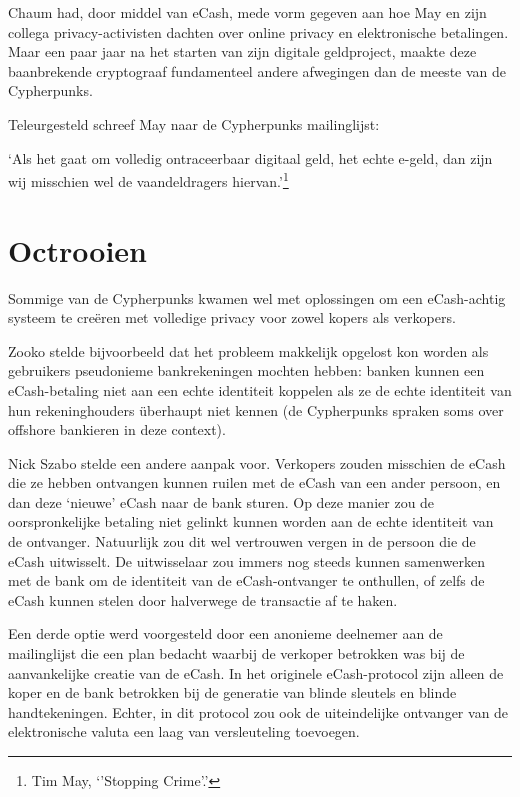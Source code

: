 \documentclass[
  a5paper,
  smalldemyvopaper,11pt,twoside,onecolumn,openright,extrafontsizes,
hidelinks]{memoir}
\begin{document}
Chaum had, door middel van eCash, mede vorm gegeven aan hoe May en zijn
collega privacy-activisten dachten over online privacy en elektronische
betalingen. Maar een paar jaar na het starten van zijn digitale
geldproject, maakte deze baanbrekende cryptograaf fundamenteel andere
afwegingen dan de meeste van de Cypherpunks.

Teleurgesteld schreef May naar de Cypherpunks mailinglijst:

`Als het gaat om volledig ontraceerbaar digitaal geld, het echte e-geld,
dan zijn wij misschien wel de vaandeldragers hiervan.'\footnote{Tim May,
  `'Stopping Crime'.'}

\section{Octrooien}\label{octrooien}

Sommige van de Cypherpunks kwamen wel met oplossingen om een
eCash-achtig systeem te creëren met volledige privacy voor zowel kopers
als verkopers.

Zooko stelde bijvoorbeeld dat het probleem makkelijk opgelost kon worden
als gebruikers pseudonieme bankrekeningen mochten hebben: banken kunnen
een eCash-betaling niet aan een echte identiteit koppelen als ze de
echte identiteit van hun rekeninghouders überhaupt niet kennen (de
Cypherpunks spraken soms over offshore bankieren in deze context).

Nick Szabo stelde een andere aanpak voor. Verkopers zouden misschien de
eCash die ze hebben ontvangen kunnen ruilen met de eCash van een ander
persoon, en dan deze `nieuwe' eCash naar de bank sturen. Op deze manier
zou de oorspronkelijke betaling niet gelinkt kunnen worden aan de echte
identiteit van de ontvanger. Natuurlijk zou dit wel vertrouwen vergen in
de persoon die de eCash uitwisselt. De uitwisselaar zou immers nog
steeds kunnen samenwerken met de bank om de identiteit van de
eCash-ontvanger te onthullen, of zelfs de eCash kunnen stelen door
halverwege de transactie af te haken.

Een derde optie werd voorgesteld door een anonieme deelnemer aan de
mailinglijst die een plan bedacht waarbij de verkoper betrokken was bij
de aanvankelijke creatie van de eCash. In het originele eCash-protocol
zijn alleen de koper en de bank betrokken bij de generatie van blinde
sleutels en blinde handtekeningen. Echter, in dit protocol zou ook de
uiteindelijke ontvanger van de elektronische valuta een laag van
versleuteling toevoegen.
\end{document}
